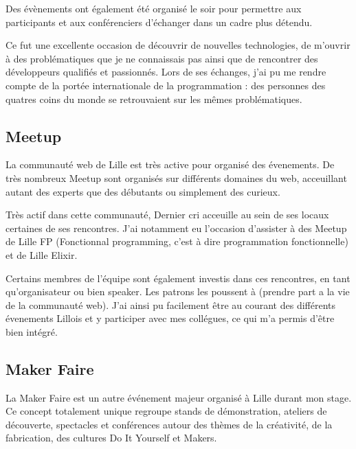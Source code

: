 \documentclass[12pt,a4paper]{article}
\begin{document}
  \bigskip

  Des évènements ont également été organisé le soir pour permettre aux
  participants et aux conférenciers d'échanger dans un cadre plus détendu.

  \bigskip

  Ce fut une excellente occasion de découvrir de nouvelles technologies,
  de m'ouvrir à des problématiques que je ne connaissais pas ainsi que de
  rencontrer des développeurs qualifiés et passionnés. Lors de ses
  échanges, j'ai pu me rendre compte de la portée internationale de la
  programmation : des personnes des quatres coins du monde se retrouvaient
  sur les mêmes problématiques.

  \bigskip

  \subsection{Meetup}\label{meetup}

  \bigskip

  La communauté web de Lille est très active pour organisé des évenements.
  De très nombreux Meetup sont organisés sur différents domaines du web,
  acceuillant autant des experts que des débutants ou simplement des
  curieux.

  \bigskip

  Très actif dans cette communauté, Dernier cri acceuille au sein de ses
  locaux certaines de ses rencontres. J'ai notamment eu l'occasion
  d'assister à des Meetup de Lille FP (Fonctionnal programming, c'est à
  dire programmation fonctionnelle) et de Lille Elixir.

  \bigskip

  Certains membres de l'équipe sont également investis dans ces
  rencontres, en tant qu'organisateur ou bien speaker. Les patrons les
  poussent à (prendre part a la vie de la communauté web). J'ai ainsi pu
  facilement être au courant des différents évenements Lillois et y
  participer avec mes collégues, ce qui m'a permis d'être bien intégré.

  \bigskip

  \subsection{Maker Faire}\label{maker-faire}

  \bigskip

  La Maker Faire est un autre événement majeur organisé à Lille durant mon
  stage. Ce concept totalement unique regroupe stands de démonstration,
  ateliers de découverte, spectacles et conférences autour des thèmes de
  la créativité, de la fabrication, des cultures Do It Yourself et Makers.
\end{document}
